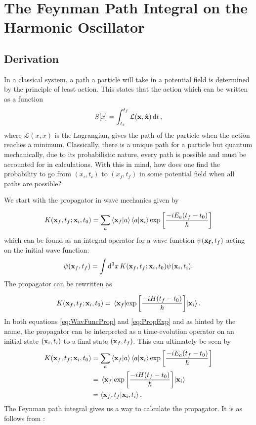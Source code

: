 \documentclass[11pt]{article}
\begin{document}
\section{The Feynman Path Integral on the Harmonic Oscillator}
\subsection{Derivation}
In a classical system, a path a particle will take in a potential field is determined by the principle of least action. This states that the action which can be written as a function 
\begin{align}
	S[x]=\int_{t_i}^{t_f}\mathcal{L}(\vb{x},\dot{\vb{x}})\dd{t},
	\label{eq:Action}
\end{align}
where $\mathcal{L}(x,\dot{x})$ is the Lagrangian, gives the path of the particle when the action reaches a minimum. Classically, there is a unique path for a particle but quantum mechanically, due to its probabilistic nature, every path is possible and must be accounted for in calculations. With this in mind, how does one find the probability to go from $(x_i,t_i)$ to $(x_f,t_f)$ in some potential field when all paths are possible?

We start with the propagator in wave mechanics given by \cite{QuantumBook}

\begin{align}
	K(\vb{x}_f,t_f;\vb{x}_i,t_0)=\sum_a\bra{\vb{x}_f}\ket{a}\bra{a}\ket{\vb{x}_i}\exp\left[\frac{-iE_a(t_f-t_0)}{\hbar}\right]
\end{align}
which can be found as an integral operator for a wave function $\psi(\vb{x_f},t_f)$ acting on the initial wave function:
\begin{align}
	\psi(\vb{x}_f,t_f)=\int\dd[3]{x}K(\vb{x}_f,t_f;\vb{x}_i,t_0)\psi(\vb{x}_i,t_i).
	\label{eq:WavFuncProp}
\end{align}
The propagator can be rewritten as

\begin{align}
	K(\vb{x}_f,t_f;\vb{x}_i,t_0)=\mel{\vb{x}_f}{\exp\left[\frac{-iH(t_f-t_0)}{\hbar}\right]}{\vb{x}_i}.
	\label{eq:PropExp}
\end{align}
In both equations \ref{eq:WavFuncProp} and \ref{eq:PropExp} and as hinted by the name, the propagator can be interpreted as a time-evolution operator on an initial state $(\vb{x}_i,t_i)$ to a final state $(\vb{x}_f,t_f)$. This can ultimately be seen by
\begin{align}
\begin{split}
	K(\vb{x}_f,t_f;\vb{x}_i,t_0)&=\sum_a\bra{\vb{x}_f}\ket{a}\bra{a}\ket{\vb{x}_i}\exp\left[\frac{-iE_a(t_f-t_0)}{\hbar}\right]\\
	&=\mel{\vb{x}_f}{\exp\left[\frac{-iH(t_f-t_0)}{\hbar}\right]}{\vb{x}_i}\\
	&=\bra{\vb{x}_f,t_f}\ket{\vb{x_i},t_i}.
\end{split}
\end{align}
The Feynman path integral gives us a way to calculate the propagator. It is as follows from \cite{MainPaper}:
\end{document}

